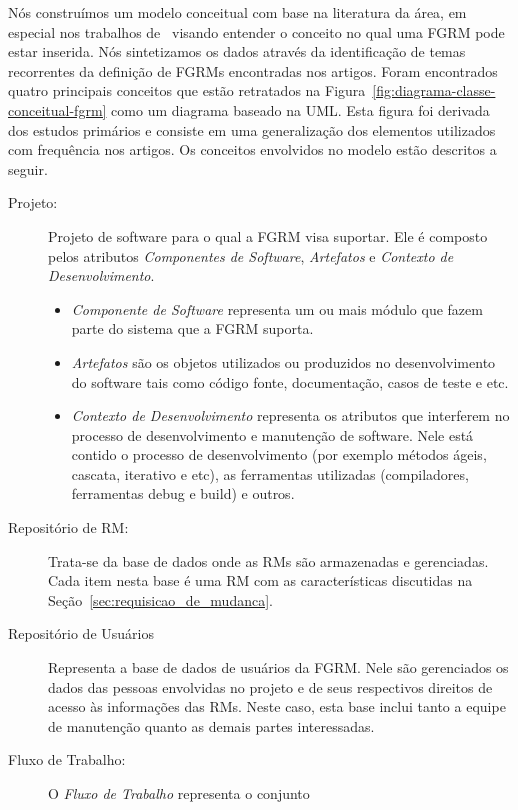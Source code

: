 Nós construímos um modelo conceitual com base na literatura da área, em especial
nos trabalhos de~\cite{cavalcanti2014challenges, singh2011bug,
	kshirsagar2015issue} visando entender o conceito no qual uma FGRM pode estar
inserida. Nós sintetizamos os dados através da identificação de temas
recorrentes da definição de FGRMs encontradas nos artigos. Foram encontrados
quatro principais conceitos que estão retratados na
Figura~\ref{fig:diagrama-classe-conceitual-fgrm} como um diagrama baseado na
UML\@. Esta figura foi derivada dos estudos primários e consiste em uma
generalização dos elementos utilizados com frequência nos artigos. Os conceitos
envolvidos no modelo estão descritos a seguir.

\begin{description}
	\item[Projeto:] Projeto de software para o qual a FGRM visa suportar.
		Ele é composto pelos atributos \textit{Componentes de Software},
		\textit{Artefatos} e \textit{Contexto de Desenvolvimento}.
		\begin{itemize}
			\item  \textit{Componente de Software} representa um ou mais módulo
				que fazem parte do sistema que a FGRM suporta.
			\item \textit{Artefatos} são os objetos utilizados ou produzidos no
				desenvolvimento do software tais como código fonte,
				documentação, casos de teste e etc.
			\item \textit{Contexto de Desenvolvimento} representa os atributos
				que interferem no processo de desenvolvimento e manutenção de
				software. Nele está contido o processo de desenvolvimento (por
				exemplo métodos ágeis, cascata, iterativo e etc), as ferramentas
				utilizadas (compiladores, ferramentas debug e build) e outros.
		\end{itemize}
	\item[Repositório de RM:] Trata-se da base de dados onde as RMs são
		armazenadas e gerenciadas. Cada item nesta base é uma RM com as
		características discutidas na Seção~\ref{sec:requisicao_de_mudanca}.
	\item[Repositório de Usuários] Representa a base de dados de usuários da
		FGRM\@. Nele são gerenciados os dados das pessoas envolvidas no projeto e
		de seus respectivos direitos de acesso às informações das RMs. Neste
		caso, esta base inclui tanto a equipe de manutenção quanto as demais
		partes interessadas.
	\item[Fluxo de Trabalho:] O \textit{Fluxo de Trabalho} representa o conjunto

\end{description}
